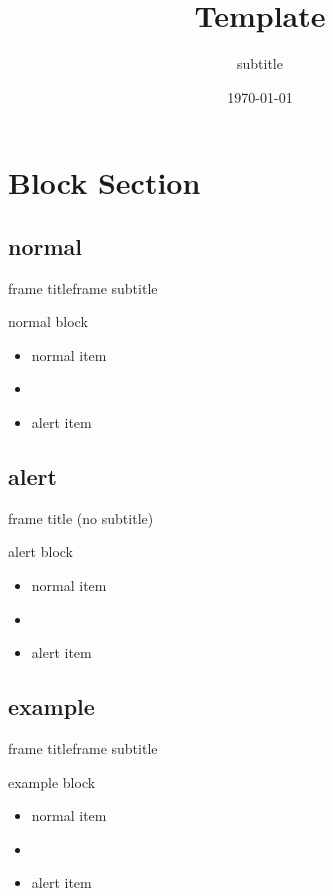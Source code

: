 \documentclass[12pt,unicode]{beamer}
\title[Tmpl.]{Template}
\subtitle{subtitle}
\author[bowcalm]{}
\institute[Inst.]{}
\date{\today}
\begin{document}
  \begin{frame}
    \maketitle
  \end{frame}

  \section{Block Section}
  \subsection{normal}
  \begin{frame}{frame title}{frame subtitle}
    \begin{block}{normal block}
      \begin{itemize}
        \item normal item
        \item {}
        \item \alert{alert item}
      \end{itemize}
    \end{block}
  \end{frame}

  \subsection{alert}
  \begin{frame}{frame title (no subtitle)}
    \begin{alertblock}{alert block}
      \begin{itemize}
        \item normal item
        \item {}
        \item \alert{alert item}
      \end{itemize}
    \end{alertblock}
  \end{frame}

  \subsection{example}
  \begin{frame}{frame title}{frame subtitle}
    \begin{exampleblock}{example block}
      \begin{itemize}
        \item normal item
        \item {}
        \item \alert{alert item}
      \end{itemize}
    \end{exampleblock}
  \end{frame}
\end{document}
